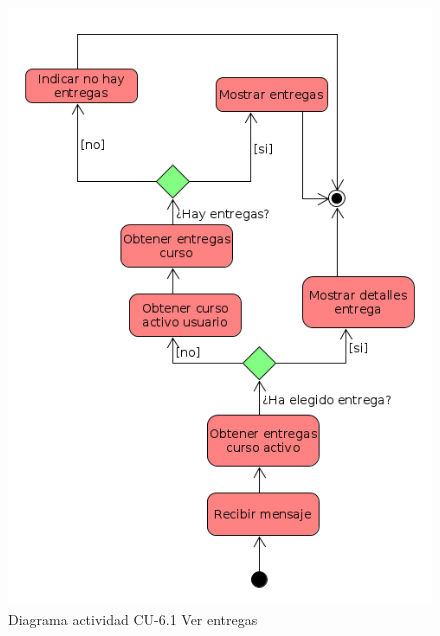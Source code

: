         \begin{figure}[H] %
\centering
\includegraphics[scale=0.4]{imagenes/diagramas/actividad/mostrar_entregass.png}  %

\caption{Diagrama actividad CU-6.1 Ver entregas}\label{figura153}
\end{figure}

